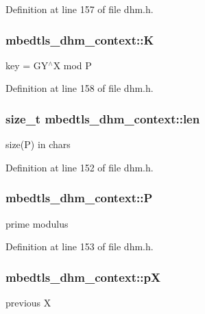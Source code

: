 Definition at line 157 of file dhm.\-h.

\hypertarget{structmbedtls__dhm__context_a2226d2a7380caf66c6e962e8d5edbb41}{
\subsubsection[{K}]{ mbedtls\-\_\-dhm\-\_\-context\-::\-K}}\label{structmbedtls__dhm__context_a2226d2a7380caf66c6e962e8d5edbb41}
key = G\-Y$^\wedge$\-X mod P 

Definition at line 158 of file dhm.\-h.

\hypertarget{structmbedtls__dhm__context_aaadf5b8713eeb657004c50742d9e26b1}{
\subsubsection[{len}]{\setlength{\rightskip}{0pt plus 5cm}size\-\_\-t mbedtls\-\_\-dhm\-\_\-context\-::len}}\label{structmbedtls__dhm__context_aaadf5b8713eeb657004c50742d9e26b1}
size(\-P) in chars 

Definition at line 152 of file dhm.\-h.

\hypertarget{structmbedtls__dhm__context_a94404f47038e146712b25d142ea4abd0}{
\subsubsection[{P}]{ mbedtls\-\_\-dhm\-\_\-context\-::\-P}}\label{structmbedtls__dhm__context_a94404f47038e146712b25d142ea4abd0}
prime modulus 

Definition at line 153 of file dhm.\-h.

\hypertarget{structmbedtls__dhm__context_abd0b3459e4a58e2b29b3bd29f6358319}{
\subsubsection[{p\-X}]{ mbedtls\-\_\-dhm\-\_\-context\-::p\-X}}\label{structmbedtls__dhm__context_abd0b3459e4a58e2b29b3bd29f6358319}
previous X 

